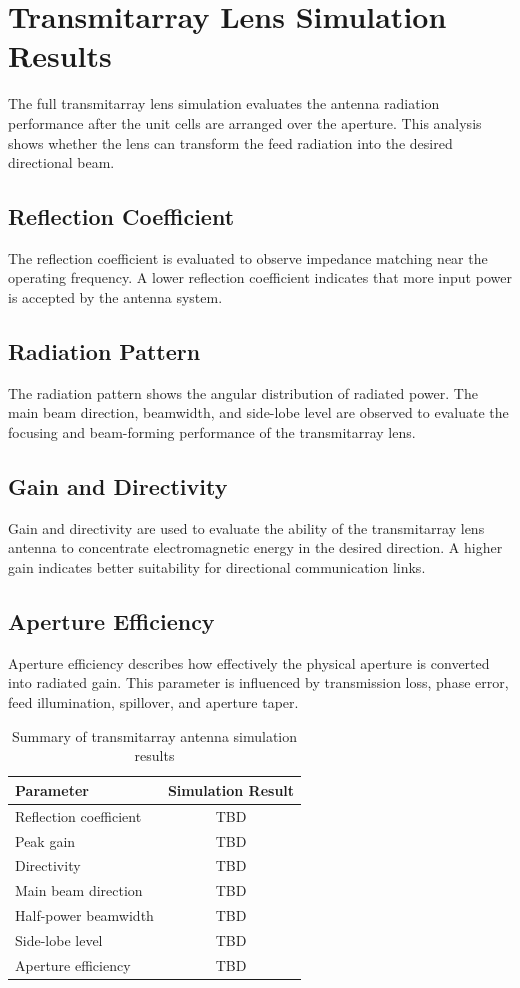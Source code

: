 \section{Transmitarray Lens Simulation Results}
The full transmitarray lens simulation evaluates the antenna radiation performance after the unit cells are arranged over the aperture. This analysis shows whether the lens can transform the feed radiation into the desired directional beam.

\subsection{Reflection Coefficient}
The reflection coefficient is evaluated to observe impedance matching near the operating frequency. A lower reflection coefficient indicates that more input power is accepted by the antenna system.

\subsection{Radiation Pattern}
The radiation pattern shows the angular distribution of radiated power. The main beam direction, beamwidth, and side-lobe level are observed to evaluate the focusing and beam-forming performance of the transmitarray lens.

\subsection{Gain and Directivity}
Gain and directivity are used to evaluate the ability of the transmitarray lens antenna to concentrate electromagnetic energy in the desired direction. A higher gain indicates better suitability for directional communication links.

\subsection{Aperture Efficiency}
Aperture efficiency describes how effectively the physical aperture is converted into radiated gain. This parameter is influenced by transmission loss, phase error, feed illumination, spillover, and aperture taper.

\begin{table}[h!]
	\begin{center}
		\caption{Summary of transmitarray antenna simulation results}
		\label{table:antenna_results}
		\begin{tabular}{|l|c|}
			\hline
			\textbf{Parameter} & \textbf{Simulation Result} \\
			\hline
			Reflection coefficient & TBD \\
			Peak gain & TBD \\
			Directivity & TBD \\
			Main beam direction & TBD \\
			Half-power beamwidth & TBD \\
			Side-lobe level & TBD \\
			Aperture efficiency & TBD \\
			\hline
		\end{tabular}
	\end{center}
\end{table}

